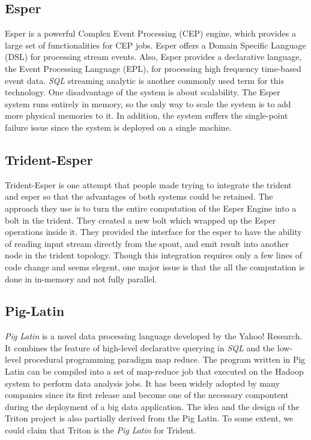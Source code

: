 \documentclass[conference, twocolumn, 11pt]{IEEEtran}
\theoremstyle{definition}
\begin{document}
\subsection{Esper}
Esper is a powerful Complex Event Processing (CEP) engine, which provides a large set of functionalities for CEP jobs. Esper offers a Domain Specific Language (DSL) for processing stream events.
Also, Esper provides a declarative language, the Event Processing Language (EPL), for processing high frequency time-based event data. \emph{SQL} streaming analytic is another commonly used term for this
technology. One disadvantage of the system is about scalability. The Esper system runs entirely in memory, so the only way to scale the system is to add more physical memories to it. In addition,
the system suffers the single-point failure issue since the system is deployed on a single machine.

\subsection{Trident-Esper}
Trident-Esper is one attempt that people made trying to integrate the trident and esper so that the advantages of both systems could be retained. The approach they use is to turn the entire
computation of the Esper Engine into a bolt in the trident. They created a new bolt which wrapped up the Esper operations inside it. They provided the interface for the esper to have the
ability of reading input stream directly from the spout, and emit result into another node in the trident topology. Though this integration requires only a few lines of code change and seems
elegent, one major issue is that the all the computation is done in in-memory and not fully parallel.

\subsection{Pig-Latin}
\emph{Pig Latin} is a novel data processing language developed by the Yahoo! Research. It combines the feature of high-level declarative querying in \emph{SQL} and the low-level procedural programming
paradigm map reduce. The program written in Pig Latin can be compiled into a set of map-reduce job that executed on the Hadoop system to perform data analysis jobs. It has been widely adopted by
many companies since its first release and become one of the necessary compontent during the deployment of a big data application. The idea and the design of the Triton project is also partially derived
from the Pig Latin. To some extent, we could claim that Triton is the \emph{Pig Latin} for Trident.
\end{document}
